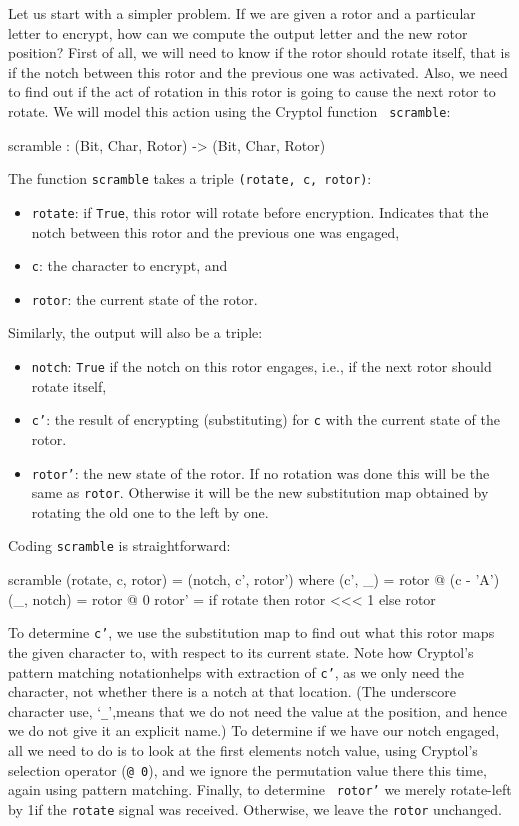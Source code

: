 Let us start with a simpler problem.  If we are given a rotor and a
particular letter to encrypt, how can we compute the output letter and
the new rotor position?  First of all, we will need to know if the
rotor should rotate itself, that is if the notch between this rotor
and the previous one was activated. Also, we need to find out if the
act of rotation in this rotor is going to cause the next rotor to
rotate. We will model this action using the Cryptol function {\tt
  scramble}:
\begin{code}
  scramble : (Bit, Char, Rotor) -> (Bit, Char, Rotor)
\end{code}
The function {\tt scramble} takes a triple \texttt{(rotate, c, rotor)}:
\begin{itemize}
\item {\tt rotate}: if {\tt True}, this rotor will rotate before
  encryption. Indicates that the notch between this rotor and the
  previous one was engaged,
  \item {\tt c}: the character to encrypt, and
  \item {\tt rotor}: the current state of the rotor.
\end{itemize}
Similarly, the output will also be a triple:
\begin{itemize}
\item {\tt notch}: {\tt True} if the notch on this rotor engages,
  i.e., if the next rotor should rotate itself,
\item {\tt c'}: the result of encrypting (substituting) for {\tt c}
  with the current state of the rotor.
\item {\tt rotor'}: the new state of the rotor. If no rotation was
  done this will be the same as {\tt rotor}. Otherwise it will be the
  new substitution map obtained by rotating the old one to the left by
  one.
\end{itemize}
Coding {\tt scramble} is straightforward:
\begin{code}
  scramble (rotate, c, rotor) = (notch, c', rotor')
    where 
      (c', _)    = rotor @ (c - 'A')
      (_, notch) = rotor @ 0
      rotor'     = if rotate then rotor <<< 1 else rotor
\end{code}
To determine {\tt c'}, we use the substitution map to find out what
this rotor maps the given character to, with respect to its current
state. Note how Cryptol's pattern matching notation\indPatMatch helps
with extraction of {\tt c'}, as we only need the character, not
whether there is a notch at that location.  (The underscore character
use, `\texttt{\_}',\indUnderscore means that we do not need the value
at the position, and hence we do not give it an explicit name.) To
determine if we have our notch engaged, all we need to do is to look
at the first elements notch value, using Cryptol's selection operator
({\tt @ 0}\indIndex), and we ignore the permutation value there this
time, again using pattern matching.  Finally, to determine {\tt
  rotor'} we merely rotate-left by 1\indRotLeft if the {\tt rotate}
signal was received. Otherwise, we leave the {\tt rotor} unchanged.

